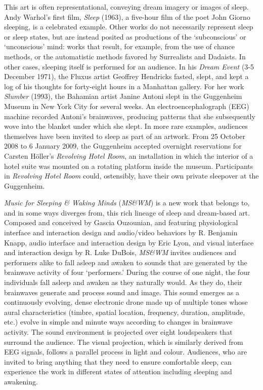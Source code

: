 This art is often representational, conveying dream imagery or images of sleep.
Andy Warhol's first film, \textit{Sleep} (1963), a five-hour film of the poet
John Giorno sleeping, is a celebrated example. Other works do not necessarily
represent sleep or sleep states, but are instead posited as productions of the
`subconscious' or `unconscious' mind: works that result, for example, from the
use of chance methods, or the automatistic methods favored by Surrealists and
Dadaists. In other cases, sleeping itself is performed for an audience. In his
\textit{Dream Event }(3-5 December 1971), the Fluxus artist Geoffrey Hendricks
fasted, slept, and kept a log of his thoughts for forty-eight hours in a
Manhattan gallery.  For her work \textit{Slumber }(1993), the Bahamian artist
Janine Antoni slept in the Guggenheim Museum in New York City for several weeks.
An electroencephalograph (EEG) machine recorded Antoni's brainwaves, producing
patterns that she subsequently wove into the blanket under which she slept. In
more rare examples, audiences themselves have been invited to sleep as part of an
artwork.  From 25 October 2008 to 6 January 2009, the Guggenheim accepted
overnight reservations for Carsten H\"{o}ller's \textit{Revolving Hotel Room}, an
installation in which the interior of a hotel suite was mounted on a rotating
platform inside the museum.  Participants in \textit{Revolving Hotel Room }could,
ostensibly, have their own private sleepover at the Guggenheim.

\textit{Music for Sleeping \& Waking Minds }(\textit{MS\&WM}) is a new work that
belongs to, and in some ways diverges from, this rich lineage of sleep and
dream-based art. Composed and conceived by Gascia Ouzounian, and featuring
physiological interface and interaction design and audio/video behaviors by R.
Benjamin Knapp, audio interface and interaction design by Eric Lyon, and visual
interface and interaction design by R. Luke DuBois, \textit{MS\&WM }invites
audiences and performers alike to fall asleep and awaken to sounds that are
generated by the brainwave activity of four `performers.' During the course of
one night, the four individuals fall asleep and awaken as they naturally would. 
As they do, their brainwaves generate and process sound and image. This sound
emerges as a continuously evolving, dense electronic drone made up of multiple
tones whose aural characteristics (timbre, spatial location, frequency, duration,
amplitude, etc.) evolve in simple and minute ways according to changes in
brainwave activity. The sound environment is projected over eight loudspeakers
that surround the audience. The visual projection, which is similarly derived
from EEG signals, follows a parallel process in light and colour. Audiences, who
are invited to bring anything that they need to ensure comfortable sleep, can
experience the work in different states of attention including sleeping and
awakening.

